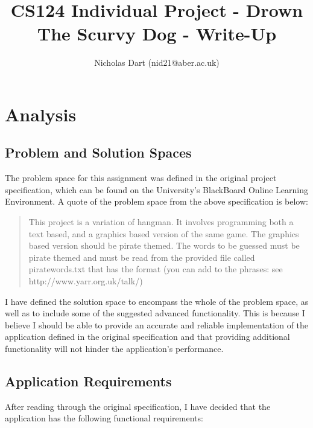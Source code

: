 \documentclass[a4paper, 11pt]{article}
\begin{document}
\title{CS124 Individual Project - Drown The Scurvy Dog - Write-Up}
\author{Nicholas Dart (nid21@aber.ac.uk)}
\date{}

\maketitle
\tableofcontents

\newpage

\section{Analysis}

\subsection{Problem and Solution Spaces}

The problem space for this assignment was defined in the original project specification, which can be found on the University's BlackBoard Online Learning Environment. A quote of the problem space from the above specification is below:

\begin{quote}
This project is a variation of hangman. It involves programming both a text based, and a graphics based version of the same game. The graphics based version should be pirate themed. The words to be guessed must be pirate themed and must be read from the provided file called piratewords.txt that has the format (you can add to the phrases: see http://www.yarr.org.uk/talk/)
\end{quote}

I have defined the solution space to encompass the whole of the problem space, as well as to include some of the suggested advanced functionality. This is because I believe I should be able to provide an accurate and reliable implementation of the application defined in the original specification and that providing additional functionality will not hinder the application's performance.

\subsection{Application Requirements}

After reading through the original specification, I have decided that the application has the following functional requirements:
\end{document}
